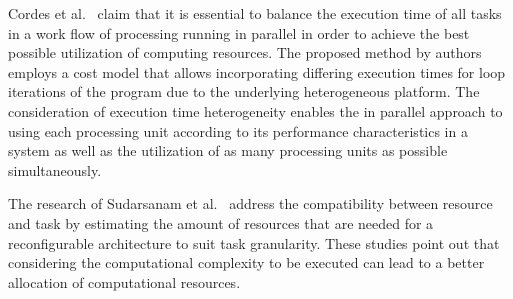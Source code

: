 Cordes et al.~\cite{cordes2011} claim that it is essential to balance the execution time of all tasks in a work flow of processing running in parallel in order to achieve the best possible utilization of computing resources. The proposed method by authors employs a cost model that allows incorporating differing execution times for loop iterations of the program due to the underlying heterogeneous platform. The consideration of execution time heterogeneity enables the in parallel approach to using each processing unit according to its performance characteristics in a system as well as the utilization of as many processing units as possible simultaneously.

The research of Sudarsanam et al.~\cite{sudarsanam2004} address the compatibility between resource and task by estimating the amount of resources that are needed for a reconfigurable architecture to suit task granularity. These studies point out that considering the computational complexity to be executed can lead to a better allocation of computational resources.

